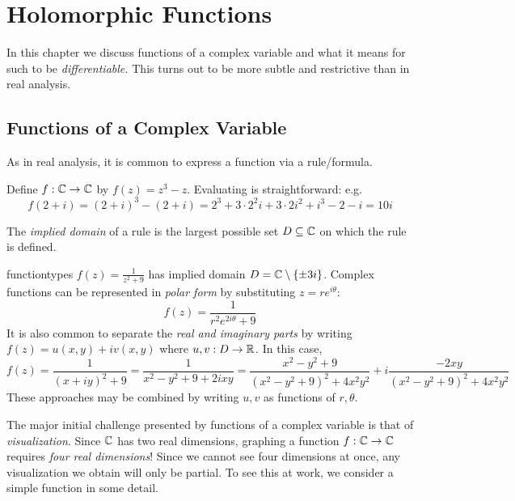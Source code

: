 \graphicspath{{2holom/asy/}}
\thispagestyle{empty}

\section{Holomorphic Functions}\label{chap:holom}

In this chapter we discuss functions of a complex variable and what it means for such to be \emph{differentiable.} This turns out to be more subtle and restrictive than in real analysis.

\subsection{Functions of a Complex Variable}\label{sec:func}%

As in real analysis, it is common to express a function via a rule/formula.

\begin{example}{}{}
	Define $f:\mathbb{C}\to\mathbb{C}$ by $f(z)=z^3-z$. Evaluating is straightforward: e.g.
	\[
		f(2+i) =(2+i)^3-(2+i) =2^3+3\cdot 2^2i+3\cdot 2i^2+i^3-2-i=10i
	\]
\end{example}

The \emph{implied domain} of a rule is the largest possible set $D\subseteq \mathbb{C}$ on which the rule is defined.

\begin{example}{}{functiontypes}
	$f(z)=\frac 1{z^2+9}$ has implied domain $D=\mathbb{C}\setminus\{\pm 3i\}$. Complex functions can be represented in \emph{polar form} by substituting $z=re^{i\theta}$:
	\[
		f(z)=\frac 1{r^2e^{2i\theta}+9}
	\]
	It is also common to separate the \emph{real and imaginary parts} by writing $f(z)=u(x,y)+iv(x,y)$ where $u,v:D\to\mathbb{R}$. In this case,
	\[
		f(z) =\frac 1{(x+iy)^2+9} =\frac 1{x^2-y^2+9+2ixy} =\frac{x^2-y^2+9}{(x^2-y^2+9)^2+4x^2y^2} +i \frac{-2xy}{(x^2-y^2+9)^2+4x^2y^2}
	\]
	These approaches may be combined by writing $u,v$ as functions of $r,\theta$.
\end{example}

The major initial challenge presented by functions of a complex variable is that of \emph{visualization}. Since $\mathbb{C}$ has two real dimensions, graphing a function $f:\mathbb{C}\to\mathbb{C}$ requires \emph{four real dimensions}! Since we cannot see four dimensions at once, any visualization we obtain will only be partial. To see this at work, we consider a simple function in some detail.

